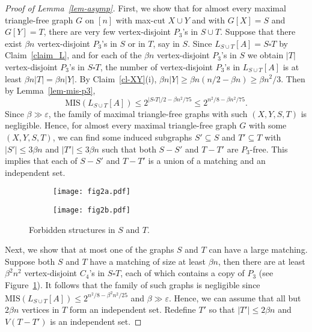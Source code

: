 \documentclass[12pt]{article}
\theoremstyle{definition}
\theoremstyle{definition}
\theoremstyle{definition}
\theoremstyle{definition}
\theoremstyle{definition}
\theoremstyle{definition}
\theoremstyle{definition}
\newcommand{\ep}{\varepsilon}
\newcommand{\3}{\bf{3}}
\newcommand{\MIS}{\mathrm{MIS}}
\begin{document}
\begin{proof}[Proof of Lemma~\ref{lem-asymp}]
First, we show that for almost every maximal triangle-free graph $G$ on $[n]$ with max-cut $X\cup Y$ and with $G[X]=S$ and $G[Y]=T$, there are very few vertex-disjoint $P_3$'s in $S\cup T$. Suppose that there exist $\beta n$ vertex-disjoint $P_3$'s in $S$ or in $T$, say in $S$. Since $L_{S\cup T}[A]=S\square T$ by Claim~\ref{claim_L}, and for each of the $\beta n$ vertex-disjoint $P_3$'s in $S$ we obtain $|T|$ vertex-disjoint $P_3$'s in $S\square T$, the number of vertex-disjoint $P_3$'s in $L_{S\cup T}[A]$ is at least $\beta n|T|=\beta n|Y|$. By Claim~\ref{cl-XY}(i), $\beta n |Y|\geq \beta n (n/2-\beta n)\ge \beta n^2/3$. Then by Lemma~\ref{lem-mis-p3},
$$\MIS(L_{S\cup T}[A])\leq 2^{|S\square T|/2-\beta n^2/75}\leq2^{n^2/8-\beta n^2/75}.$$
Since $\beta\gg \ep$, the family of maximal triangle-free graphs with such $(X,Y,S,T)$ is negligible. Hence, for almost every maximal triangle-free graph $G$ with some $(X,Y,S,T)$, we can find some induced subgraphs $S'\subseteq S$ and $T'\subseteq T$ with $|S'|\le 3\beta n$ and $|T'|\le 3\beta n$ such that both $S-S'$ and $T-T'$ are $P_3$-free. This implies that each of $S-S'$ and $T-T'$ is a union of a matching and an independent set. 

\begin{figure*}[t!]
    \centering
    \begin{subfigure}[t]{0.4\textwidth}
        \centering
        \texttt{[image: fig2a.pdf]}
        \caption{}\label{fig2a}
    \end{subfigure}%
    \hspace{2cm}
        \begin{subfigure}[t]{0.4\textwidth}
        \centering
        \texttt{[image: fig2b.pdf]}
        \caption{}\label{fig2b}
    \end{subfigure}
   \caption{Forbidden structures in $S$ and $T$.}
\end{figure*}




Next, we show that at most one of the graphs $S$ and $T$ can have a large matching. Suppose both $S$ and $T$ have a matching of size at least $\beta n$, then there are at least $\beta^2 n^2$ vertex-disjoint $C_4$'s in $S\square T$, each of which contains a copy of $P_3$ (see Figure~\ref{fig2a}). It follows that the family of such graphs is negligible since $\MIS(L_{S\cup T}[A])\le 2^{n^2/8-\beta^2n^2/25}$ and $\beta\gg \ep$. Hence, we can assume that all but $2 \beta n$ vertices in $T$ form an independent set. Redefine $T'$ so that $|T'|\le 2\beta n$ and $V(T-T')$ is an independent set.
%


\end{proof}
\end{document}

